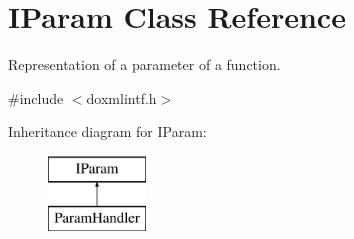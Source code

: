 \hypertarget{class_i_param}{}\section{I\+Param Class Reference}
\label{class_i_param}


Representation of a parameter of a function.  




{\ttfamily \#include $<$doxmlintf.\+h$>$}

Inheritance diagram for I\+Param\+:\begin{figure}[H]
\begin{center}
\leavevmode
\includegraphics[height=2.000000cm]{class_i_param}
\end{center}
\end{figure}
